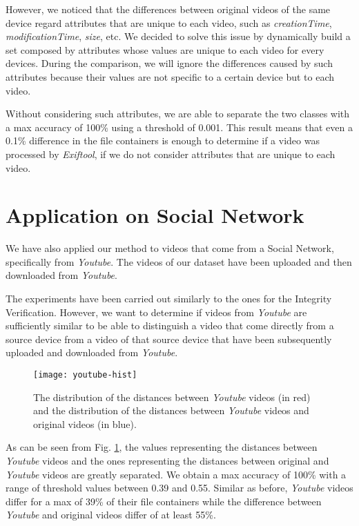 However, we noticed that the differences between original videos of the same device regard attributes that are unique to each video, such as \emph{creationTime}, \emph{modificationTime}, \emph{size}, etc. We decided to solve this issue by dynamically build a set composed by attributes whose values are unique to each video for every devices. During the comparison, we will ignore the differences caused by such attributes because their values are not specific to a certain device but to each video.

Without considering such attributes, we are able to separate the two classes with a max accuracy of 100\% using a threshold of 0.001. This result means that even a 0.1\% difference in the file containers is enough to determine if a video was processed by \emph{Exiftool}, if we do not consider attributes that are unique to each video.

\section{Application on Social Network}

We have also applied our method to videos that come from a Social Network, specifically from \emph{Youtube}. The videos of our dataset have been uploaded and then downloaded from \emph{Youtube}.

The experiments have been carried out similarly to the ones for the Integrity Verification. However, we want to determine if videos from \emph{Youtube} are sufficiently similar to be able to distinguish a video that come directly from a source device from a video of that source device that have been subsequently uploaded and downloaded from \emph{Youtube}.

\begin{figure}
  \centering
  \texttt{[image: youtube-hist]}
  \caption{The distribution of the distances between \emph{Youtube} videos (in red) and the distribution of the distances between \emph{Youtube} videos and original videos (in blue).}\label{fig:youtube-hist}
\end{figure}

As can be seen from Fig. \ref{fig:youtube-hist}, the values representing the distances between \emph{Youtube} videos and the ones representing the distances between original and \emph{Youtube} videos are greatly separated. We obtain a max accuracy of 100\% with a range of threshold values between 0.39 and 0.55. Similar as before, \emph{Youtube} videos differ for a max of 39\% of their file containers while the difference between \emph{Youtube} and original videos differ of at least 55\%.

